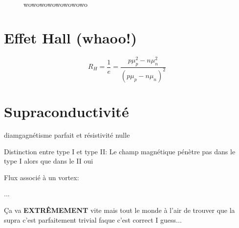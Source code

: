 \begin{figure}[ht]
    \centering
    \caption{wowowowowowowowo}
    \label{fig:wowowowowowowowo}
\end{figure}

\section*{Effet Hall (whaoo!)}

$$R_H = \frac{1}{e} = \frac{p\mu_p^{2}-n\mu_n^2}{\left( p\mu_p -n\mu_n \right)^2 } $$ 
\clearpage

\section*{Supraconductivité}

diamgagnétisme parfait et résistivité nulle

Distinction entre type I et type II: Le champ magnétique pénètre pas dans le type I alors que dans le II oui

Flux associé à un vortex:

...

Ça va \textbf{EXTRÊMEMENT} vite mais tout le monde à l'air de trouver que la supra c'est parfaitement trivial faque c'est correct I guess...






